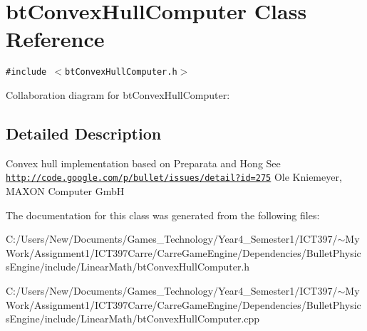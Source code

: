 \hypertarget{classbt_convex_hull_computer}{
\section{btConvexHullComputer Class Reference}
\label{classbt_convex_hull_computer}
}
{\tt \#include $<$btConvexHullComputer.h$>$}

Collaboration diagram for btConvexHullComputer:

\subsection{Detailed Description}
Convex hull implementation based on Preparata and Hong See \href{http://code.google.com/p/bullet/issues/detail?id=275}{\tt http://code.google.com/p/bullet/issues/detail?id=275} Ole Kniemeyer, MAXON Computer GmbH 

The documentation for this class was generated from the following files:\begin{CompactItemize}
\item 
C:/Users/New/Documents/Games\_\-Technology/Year4\_\-Semester1/ICT397/$\sim$My Work/Assignment1/ICT397Carre/CarreGameEngine/Dependencies/BulletPhysicsEngine/include/LinearMath/btConvexHullComputer.h\item 
C:/Users/New/Documents/Games\_\-Technology/Year4\_\-Semester1/ICT397/$\sim$My Work/Assignment1/ICT397Carre/CarreGameEngine/Dependencies/BulletPhysicsEngine/include/LinearMath/btConvexHullComputer.cpp\end{CompactItemize}
